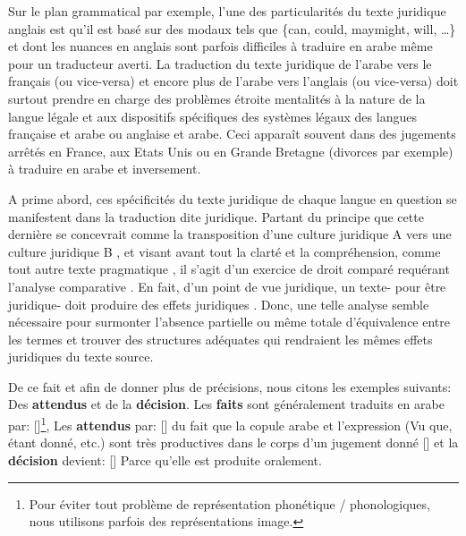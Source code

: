 \documentclass[french]{textolivre}
\begin{document}
Sur le plan grammatical par exemple, l’une des particularités du texte juridique anglais est qu’il est basé sur des modaux tels que \{can, could, maymight, will, …\} et dont les nuances en anglais sont parfois difficiles à traduire en arabe même pour un traducteur averti. La traduction du texte juridique de l’arabe vers le français (ou vice-versa) et encore plus de l’arabe vers l’anglais (ou vice-versa) doit surtout prendre en charge des problèmes étroite mentalités à la nature de la langue légale et aux dispositifs spécifiques des systèmes légaux des langues française et arabe ou anglaise et arabe. Ceci apparaît souvent dans des jugements arrêtés en France, aux Etats Unis ou en Grande Bretagne (divorces par exemple) à traduire en arabe et inversement.

A prime abord, ces spécificités du texte juridique de chaque langue en question se manifestent dans la traduction dite juridique. Partant du principe que cette dernière se concevrait comme la transposition d’une culture juridique A vers une culture juridique B \cite{bourdon2019}, et visant avant tout la clarté et la compréhension, comme tout autre texte pragmatique \cite{kubler2014}, il s’agit d’un exercice de droit comparé requérant l’analyse comparative \cite[p. 12]{gemar2019}. En fait, d’un point de vue juridique, un texte- pour être juridique- doit produire des effets juridiques \cite[p. 53]{durr2017}. Donc, une telle analyse semble nécessaire pour surmonter l’absence partielle ou même totale d’équivalence entre les termes et trouver des structures adéquates qui rendraient les mêmes effets juridiques du texte source.

De ce fait et afin de donner plus de précisions, nous citons les exemples suivants:
Des \textbf{attendus} et de la \textbf{décision}. Les \textbf{faits} sont généralement traduits en arabe par: 
[]\footnote{Pour éviter tout problème de représentation phonétique / phonologiques, nous utilisons parfois des représentations image.},
Les \textbf{attendus} par:
[]
du fait que la copule arabe   et l’expression   (Vu que, étant donné, etc.) sont très productives dans le corps d’un jugement donné   [] et la \textbf{décision} devient:
[]
Parce qu’elle est produite oralement.
\end{document}
